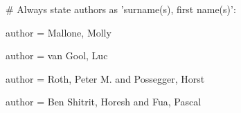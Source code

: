 # Always state authors as 'surname(s), first name(s)':

author = {Mallone, Molly}

author = {van Gool, Luc}

author = {Roth, Peter M. and Possegger, Horst}

author = {Ben Shitrit, Horesh and Fua, Pascal}
